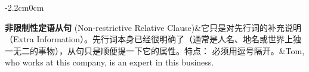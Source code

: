 \begin{landscape}
\begin{adjustwidth}{-2.2cm}{0cm}
\begin{longtblr}[
      label = none,
      ]
      \textbf{非限制性定语从句} (Non-restrictive Relative Clause)&它只是对先行词的补充说明（Extra Information）。先行词本身已经很明确了（通常是人名、地名或世界上独一无二的事物），从句只是顺便提一下它的属性。特点： 必须用逗号隔开。&Tom, who works at this company, is an expert in this business.\\
    \end{longtblr}
  \end{adjustwidth}
\end{landscape}


